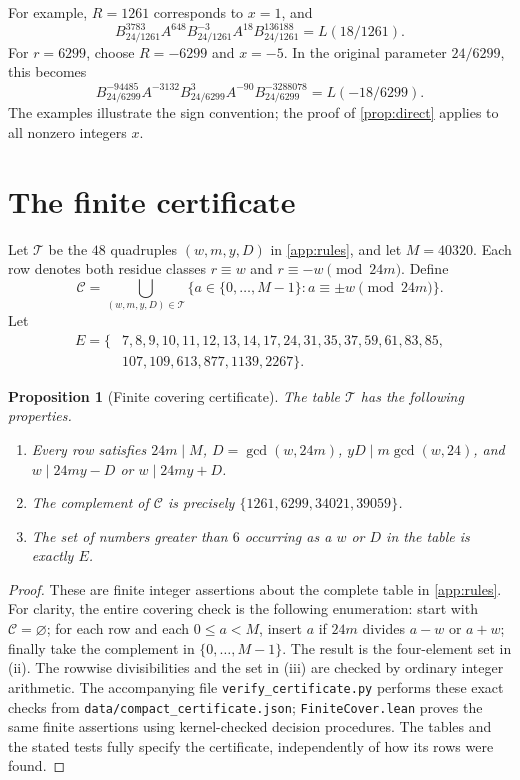 \documentclass[11pt]{article}
\newtheorem{proposition}[theorem]{Proposition}
\theoremstyle{definition}
\theoremstyle{remark}
\numberwithin{equation}{section}
\begin{document}
For example, $R=1261$ corresponds to $x=1$, and
\[
 B_{24/1261}^{3783}A^{648}B_{24/1261}^{-3}
 A^{18}B_{24/1261}^{136188}=L(18/1261).
\]
For $r=6299$, choose $R=-6299$ and $x=-5$. In the original
parameter $24/6299$, this becomes
\[
 B_{24/6299}^{-94485}A^{-3132}B_{24/6299}^{3}
 A^{-90}B_{24/6299}^{-3288078}=L(-18/6299).
\]
The examples illustrate the sign convention; the proof of
\cref{prop:direct} applies to all nonzero integers $x$.

\section{The finite certificate}\label{sec:finite}
Let $\mathcal T$ be the $48$ quadruples $(w,m,y,D)$ in
\cref{app:rules}, and let $M=40320$. Each row denotes both residue
classes $r\equiv w$ and $r\equiv-w\pmod{24m}$. Define
\begin{equation}\label{eq:cover}
 \mathcal C=\bigcup_{(w,m,y,D)\in\mathcal T}
 \{a\in\{0,\ldots,M-1\}:a\equiv\pm w\pmod{24m}\}.
\end{equation}
Let
\begin{equation}\label{eq:exceptions}
\begin{split}
 E=\{&7,8,9,10,11,12,13,14,17,24,31,35,37,59,61,83,85,\\
     &107,109,613,877,1139,2267\}.
\end{split}
\end{equation}

\begin{proposition}[Finite covering certificate]\label{prop:finite}
The table $\mathcal T$ has the following properties.
\begin{enumerate}[label=\textup{(\roman*)}]
\item Every row satisfies $24m\mid M$, $D=\gcd(w,24m)$,
$yD\mid m\gcd(w,24)$, and $w\mid24my-D$ or $w\mid24my+D$.
\item The complement of $\mathcal C$ is precisely
$\{1261,6299,34021,39059\}$.
\item The set of numbers greater than $6$ occurring as a $w$ or
$D$ in the table is exactly $E$.
\end{enumerate}
\end{proposition}
\begin{proof}
These are finite integer assertions about the complete table in
\cref{app:rules}. For clarity, the entire covering check is the
following enumeration: start with $\mathcal C=\varnothing$; for each
row and each $0\leq a<M$, insert $a$ if $24m$ divides $a-w$ or
$a+w$; finally take the complement in $\{0,\ldots,M-1\}$.
The result is the four-element set in (ii). The rowwise divisibilities
and the set in (iii) are checked by ordinary integer arithmetic.
The accompanying file \texttt{verify\_certificate.py} performs
these exact checks from \texttt{data/compact\_certificate.json};
\texttt{FiniteCover.lean} proves the same finite assertions using
kernel-checked decision procedures. The tables and the stated tests
fully specify the certificate, independently of how its rows were found.
\end{proof}
\end{document}
